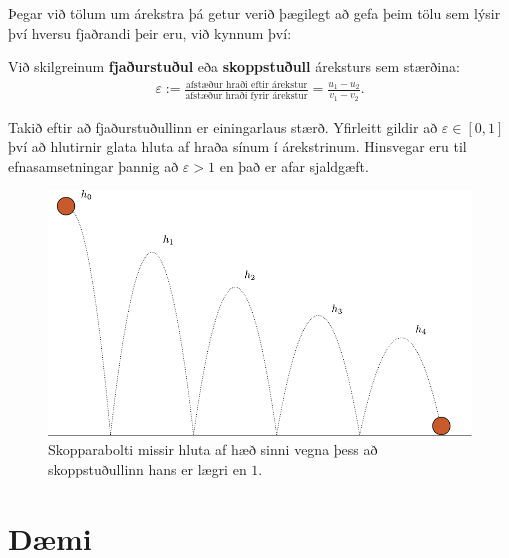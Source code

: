 \vspace{0.2cm}

Þegar við tölum um árekstra þá getur verið þægilegt að gefa þeim tölu sem lýsir því hversu fjaðrandi þeir eru, við kynnum því:

\begin{tcolorbox}
\begin{definition}
Við skilgreinum \textbf{fjaðurstuðul} eða \textbf{skoppstuðull} áreksturs sem stærðina:
\begin{align*}
    \varepsilon := \frac{\text{afstæður hraði eftir árekstur}}{\text{afstæður hraði fyrir árekstur}} = \frac{u_1 - u_2}{v_1 - v_2}.
\end{align*}
\end{definition}
\end{tcolorbox}
Takið eftir að fjaðurstuðullinn er einingarlaus stærð. Yfirleitt gildir að $\varepsilon \in [0,1]$ því að hlutirnir glata hluta af hraða sínum í árekstrinum. Hinsvegar eru til efnasamsetningar þannig að $\varepsilon > 1$ en það er afar sjaldgæft.


\begin{figure}[H]
    \centering
    \includegraphics[scale = 0.8]{figures/skopparisimple.pdf}
    \caption{Skopparabolti missir hluta af hæð sinni vegna þess að skoppstuðullinn hans er lægri en $1$.}
    \label{fig:my_label}
\end{figure}


\newpage

\section{Dæmi}

